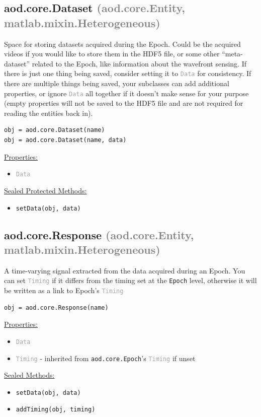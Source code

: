 \documentclass[10pt]{exam}
\newcommand\myparent[1]{\textcolor{gray}{(#1)}}
\newcommand\aodclass[1]{\textcolor{codeblue}{\texttt{#1}}}
\newcommand\aodprop[1]{\textcolor{darkgray}{\texttt{#1}}}
\newcommand\aodfcn[1]{\textcolor{darkteal}{\texttt{#1}}}
\newcommand\docheader[1]{\vspace{0.6ex}\noindent\underline{#1}\vspace{0.15ex}}
\begin{document}
	\subsection{aod.core.Dataset \myparent{aod.core.Entity, matlab.mixin.Heterogeneous}}
		\noindent Space for storing datasets acquired during the Epoch. Could be the acquired videos if you would like to store them in the HDF5 file, or some other ``meta-dataset'' related to the Epoch, like information about the wavefront sensing. If there is just one thing being saved, consider setting it to \aodprop{Data} for consistency. If there are multiple things being saved, your subclasses can add additional properties, or ignore \aodprop{Data} all together if it doesn't make sense for your purpose (empty properties will not be saved to the HDF5 file and are not required for reading the entities back in).
		\begin{lstlisting}
obj = aod.core.Dataset(name)
obj = aod.core.Dataset(name, data)
		\end{lstlisting}		
		\docheader{Properties:}
		\begin{itemize}
			\item \aodprop{Data}
		\end{itemize}
		\docheader{Sealed Protected Methods:}
		\begin{itemize}
			\item \aodfcn{setData(obj, data)}
		\end{itemize}
	
	\subsection{aod.core.Response \myparent{aod.core.Entity, matlab.mixin.Heterogeneous}} 
		\noindent A time-varying signal extracted from the data acquired during an Epoch. You can set \aodprop{Timing} if it differs from the timing set at the \aodclass{Epoch} level, otherwise it will be written as a link to Epoch's \aodprop{Timing}
		\begin{lstlisting}[style=matlab-editor, basicstyle=\mlttfamily\footnotesize]
obj = aod.core.Response(name)
		\end{lstlisting} 
		\docheader{Properties:}
		\begin{itemize}
			\item \aodprop{Data}
			\item \aodprop{Timing} - inherited from \aodclass{aod.core.Epoch}'s \aodprop{Timing} if unset
		\end{itemize}
		\docheader{Sealed Methods:}
		\begin{itemize}
			\item \aodfcn{setData(obj, data)}
			\item \aodfcn{addTiming(obj, timing)}
		\end{itemize}
	
\end{document}
